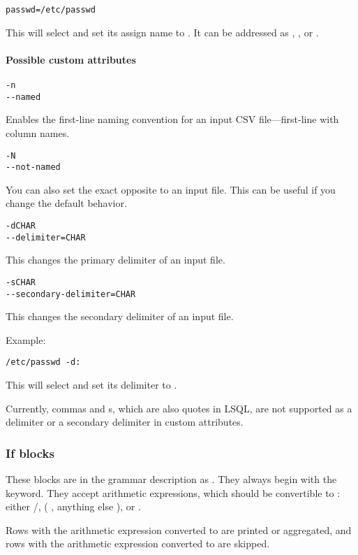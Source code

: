 \begin{verbatim}
passwd=/etc/passwd
\end{verbatim}
This will select  and set its assign name to . It can be addressed as , , or .


\paragraph{Possible custom attributes}

\begin{verbatim}
-n
--named
\end{verbatim}
Enables the first-line naming convention for an input CSV file---first-line with column names.

\begin{verbatim}
-N
--not-named
\end{verbatim}
You can also set the exact opposite to an input file. This can be useful if you change the default behavior.

\begin{verbatim}
-dCHAR
--delimiter=CHAR
\end{verbatim}
This changes the primary delimiter of an input file.

\begin{verbatim}
-sCHAR
--secondary-delimiter=CHAR
\end{verbatim}
This changes the secondary delimiter of an input file.

Example:
\begin{verbatim}
/etc/passwd -d:
\end{verbatim}
This will select  and set its delimiter to \icode{:}.

Currently, commas and s, which are also quotes in LSQL, are not supported as a delimiter or a secondary delimiter in  custom attributes.

\subsubsection{If blocks}
These blocks are in the grammar description as .
They always begin with the  keyword. 
They accept arithmetic expressions, which should be convertible to : 
either  /,  ( , anything else ), or . 

Rows with the arithmetic expression converted to   are printed or aggregated, and 
rows with the arithmetic expression converted to   are skipped.

